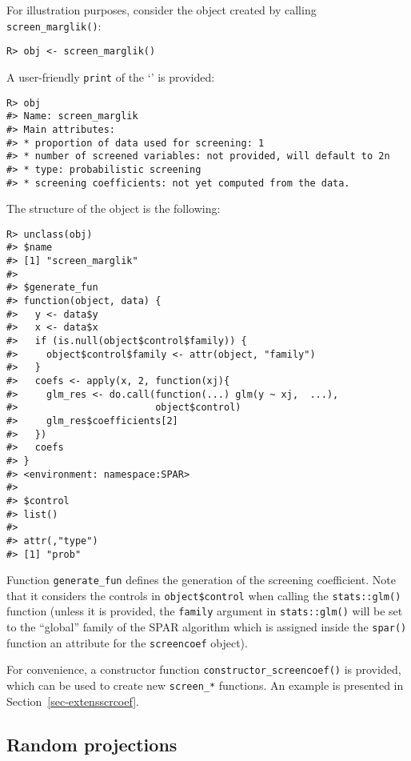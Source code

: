 \documentclass[
  article]{jss}
\newcommand{\class}[1]{`\code{#1}'}
\begin{document}
For illustration purposes, consider the object created by calling
\texttt{screen\_marglik()}:

\begin{verbatim}
R> obj <- screen_marglik()
\end{verbatim}

A user-friendly \texttt{print} of the \class{screencoef} is provided:

\begin{verbatim}
R> obj
#> Name: screen_marglik 
#> Main attributes: 
#> * proportion of data used for screening: 1 
#> * number of screened variables: not provided, will default to 2n 
#> * type: probabilistic screening 
#> * screening coefficients: not yet computed from the data.
\end{verbatim}

The structure of the object is the following:

\begin{verbatim}
R> unclass(obj)
#> $name
#> [1] "screen_marglik"
#> 
#> $generate_fun
#> function(object, data) {
#>   y <- data$y
#>   x <- data$x
#>   if (is.null(object$control$family)) {
#>     object$control$family <- attr(object, "family")
#>   }
#>   coefs <- apply(x, 2, function(xj){
#>     glm_res <- do.call(function(...) glm(y ~ xj,  ...),
#>                        object$control)
#>     glm_res$coefficients[2]
#>   })
#>   coefs
#> }
#> <environment: namespace:SPAR>
#> 
#> $control
#> list()
#> 
#> attr(,"type")
#> [1] "prob"
\end{verbatim}

Function \texttt{generate\_fun} defines the generation of the screening
coefficient. Note that it considers the controls in
\texttt{object\$control} when calling the \texttt{stats::glm()} function
(unless it is provided, the \texttt{family} argument in
\texttt{stats::glm()} will be set to the ``global'' family of the SPAR
algorithm which is assigned inside the \texttt{spar()} function an
attribute for the \texttt{screencoef} object).

For convenience, a constructor function
\texttt{constructor\_screencoef()} is provided, which can be used to
create new \texttt{screen\_*} functions. An example is presented in
Section~\ref{sec-extensscrcoef}.

\subsection{Random projections}\label{random-projections}
\end{document}
